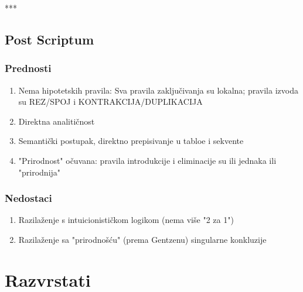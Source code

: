  \bigskip
 \centerline{***}
 \bigskip



\newpage
\section{Post Scriptum}

\subsection*{Prednosti}
\begin{enumerate}
 \item Nema hipotetskih pravila: Sva pravila zaključivanja su lokalna; \newline
       pravila izvoda su REZ/SPOJ i  KONTRAKCIJA/DUPLIKACIJA
 \item Direktna analitičnost
 \item Semantički postupak, direktno prepisivanje u tabloe i sekvente
 \item "Prirodnost" očuvana: pravila introdukcije i eliminacije su ili jednaka ili "prirodnija"
\end{enumerate}


\subsection*{Nedostaci}
\begin{enumerate}
 \item Razilaženje s intuicionističkom logikom (nema više "2 za 1") 
 \item Razilaženje sa "prirodnošću" (prema Gentzenu) singularne konkluzije
\end{enumerate}





% 
\chapter{Razvrstati}

